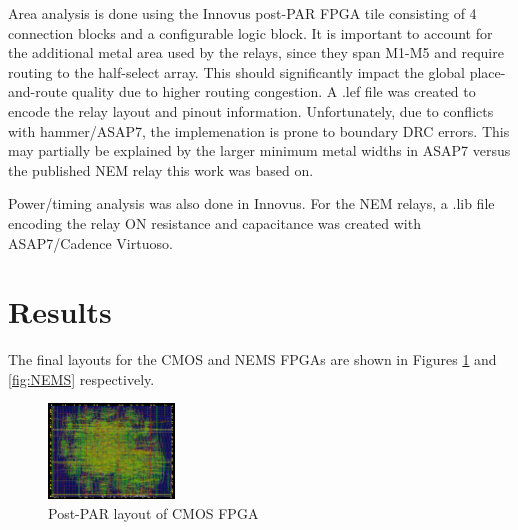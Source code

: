 \documentclass[twoside,twocolumn]{article}
\begin{document}
Area analysis is done using the Innovus post-PAR FPGA tile consisting of 4 connection blocks and a configurable logic block.
It is important to account for the additional metal area used by the relays, since they span M1-M5 and require routing to the half-select array. This should significantly impact the global place-and-route quality due to higher routing congestion. A .lef file was created to encode the relay layout and pinout information. Unfortunately, due to conflicts with hammer/ASAP7, the implemenation is prone to boundary DRC errors. This may partially be explained by the larger minimum metal widths in ASAP7 versus the published NEM relay this work was based on.

Power/timing analysis was also done in Innovus. For the NEM relays, a .lib file encoding the relay ON resistance and capacitance was created with ASAP7/Cadence Virtuoso.




\section{Results}
The final layouts for the CMOS and NEMS FPGAs are shown in Figures \ref{fig:cmos}
and \ref{fig:NEMS} respectively. 

\begin{figure}[!hbt]
    \centering
    \includegraphics[width=0.3\textwidth]{figs/cmos_innovus.png}
    \caption{Post-PAR layout of CMOS FPGA}
    \label{fig:cmos}
\end{figure}
\end{document}
